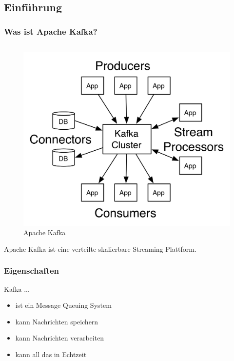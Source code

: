 \subsection{Einführung}
\begin{frame}
\frametitle{Was ist Apache Kafka?}
\begin{columns}[T]
	\begin{column}[T]{0.49\textwidth}
		
	\end{column}
	\begin{column}[T]{0.49\textwidth}
		
\end{column}
\end{columns}

\centering
\begin{figure}[h]
	\includegraphics[scale=1.0]{figure/kafka-apis.png}
	\caption{Apache Kafka~\cite{Kafka}}
\end{figure}

Apache Kafka ist eine verteilte skalierbare Streaming Plattform.

\end{frame}


\begin{frame}
\frametitle{Eigenschaften}
Kafka ...
\begin{itemize}
	\item ist ein Message Queuing System
	\item kann Nachrichten speichern
	\item kann Nachrichten verarbeiten
	\item kann all das in Echtzeit
\end{itemize}

\end{frame}


